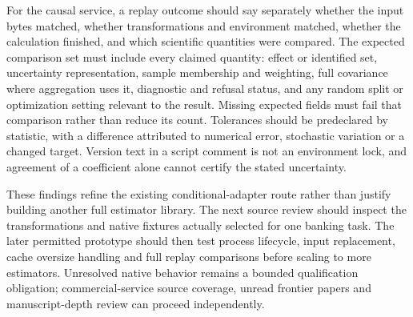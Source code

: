 For the causal service, a replay outcome should say separately whether the
input bytes matched, whether transformations and environment matched, whether
the calculation finished, and which scientific quantities were compared.
The expected comparison set must include every claimed quantity: effect or
identified set, uncertainty representation, sample membership and weighting,
full covariance where aggregation uses it, diagnostic and refusal status,
and any random split or optimization setting relevant to the result. Missing
expected fields must fail that comparison rather than reduce its count.
Tolerances should be predeclared by statistic, with a difference attributed to
numerical error, stochastic variation or a changed target. Version text in a
script comment is not an environment lock, and agreement of a coefficient
alone cannot certify the stated uncertainty.

These findings refine the existing conditional-adapter route rather than
justify building another full estimator library. The next source review should
inspect the transformations and native fixtures actually selected for one
banking task. The later permitted prototype should then test process lifecycle,
input replacement, cache oversize handling and full replay comparisons before
scaling to more estimators. Unresolved native behavior remains a bounded
qualification obligation; commercial-service source coverage, unread frontier
papers and manuscript-depth review can proceed independently.

